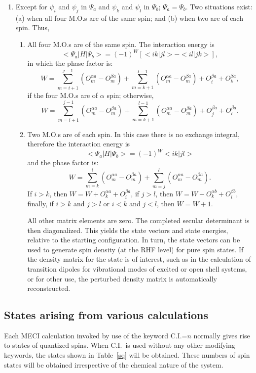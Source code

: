 \begin{enumerate}
\item Except for $\psi_i$ and $\psi_j$ in $\Psi_a$ and $\psi_k$ and
$\psi_l$ in $\Psi_b$; $\Psi_a = \Psi_b$.
 Two situations exist: (a) when all four M.O.s are of
the same spin; and (b) when two are of each spin. Thus,
\begin{enumerate}
\item All four M.O.s are of the same spin. The
interaction energy is
$$
<\Psi_a|H|\Psi_b> = (-1)^W[<ik|jl>-<il|jk>],
$$
in which the phase factor is:
$$
W=\sum_{m=i+1}^{j-1}(O_m^{\alpha a}-O_m^{\beta a})
+ \sum_{m=k+1}^{l-1}(O_m^{\alpha a}-O_m^{\beta a})+O_i^{\beta a} + O_k^{\beta a},
$$
if the four M.O.s are of $\alpha$ spin; otherwise,
$$
W=\sum_{m=i+1}^{j-1}(O_m^{\alpha a}-O_m^{\beta a})
+ \sum_{m=k+1}^{l-1}(O_m^{\alpha a}-O_m^{\beta a})+O_j^{\beta a} + O_l^{\beta a}.
$$
\item Two M.O.s are of each spin. In this case there is
no exchange integral, therefore the interaction energy is
$$
<\Psi_a|H|\Psi_b> = (-1)^W<ik|jl>
$$
and the phase factor is:
$$
W=\sum_{m=k}^{i}(O_m^{\alpha a}-O_m^{\beta a})
+ \sum_{m=j}^{l}(O_m^{\alpha a}-O_m^{\beta a}).
$$
If $i>k$, then $W=W+O_k^{\alpha a}+O_i^{\beta a}$,
if $j>l$, then $W=W+O_k^{\alpha b}+O_i^{\beta b}$,
finally, if $i>k$ and $j>l$ or  $i<k$ and $j<l$, then $W=W+1$.

All other matrix elements are zero. The completed secular determinant is then
diagonalized. This yields the  state
vectors and state energies, relative to the starting configuration. In turn,
the state vectors can be used to generate  spin density (at the RHF level) for
pure spin states. If the density matrix for the state is of interest, such as
in the calculation of transition dipoles for vibrational modes of excited or
open shell systems, or for other use, the perturbed density matrix is automatically  reconstructed.
\end{enumerate}
\end{enumerate}

\subsection{States arising from various calculations}
Each MECI calculation invoked by use of the keyword C.I.=$n$ normally
 gives  rise to states of quantized spins.  When
C.I.\ is used without any other modifying keywords, the states shown in
Table~\ref{sq} will be obtained. These numbers of spin states will be obtained
irrespective  of  the chemical nature of the system.

